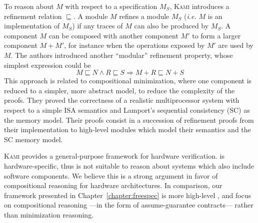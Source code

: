 To reason about \( M \) with respect to a specification \( M_S \), {\scshape
  Kami} introduces a refinement relation \( \sqsubseteq \).
%
A module \( M \) refines a module \( M_S \) (\emph{i.e.} \( M \) is an
implementation of \( M_S \)) if any traces of \( M \) can also be produced by
\( M_S \).
%
A component \( M \) can be composed with another component \( M' \) to form a
larger component \( M + M' \), for instance when the operations exposed by
\( M' \) are used by \( M \).
%
The authors introduced another ``modular'' refinement property, whose simplest
expression could be
%
\[
  M \sqsubseteq N \wedge R \sqsubseteq S \Rightarrow M + R \sqsubseteq N + S
\]
%
This approach is related to compositional minimization, where one component
is reduced to a simpler, more abstract model, to reduce the complexity of the
proofs.
%
They proved the correctness of a realistic multiprocessor system with respect to
a simple ISA semantics and Lamport's sequential consistency (SC)   as the memory model.
%
Their proofs consist in a succession of refinement proofs from their
implementation to high-level modules which model their semantics and the SC
memory model.

{\scshape Kami} provides a general-purpose framework for hardware verification.
 is hardware-specific, thus is not suitable to reason about systems which also
include software components.
%
We believe this is a strong argument in favor of compositional reasoning for
hardware architectures. 
%
In comparison, our framework presented in Chapter~\ref{chapter:freespec} is more
high-level , and focus on compositional reasoning ---in the form of
assume-guarantee contracts--- rather than minimization reasoning.

